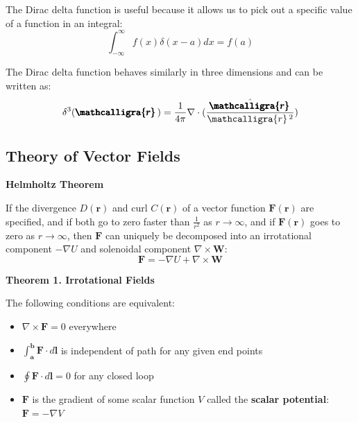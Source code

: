 \documentclass{article}
\newcommand{\scriptr}{\mathcalligra{r}\,}
\newcommand{\boldscriptr}{\pmb{\mathcalligra{r}}\,}
\begin{document}
The Dirac delta function is useful because it allows us to pick out a specific value of a function in an integral:
\[
    \int_{-\infty }^{\infty }f(x)\delta(x-a)dx=f(a)
\]

The Dirac delta function behaves similarly in three dimensions and can be written as:
\[
    \delta^3(\boldscriptr)=\frac{1}{4 \pi }\nabla \cdot (\frac{\hat{\boldscriptr}}{\scriptr^2})
\]

\subsection{Theory of Vector Fields}
\begin{theorem}{\textbf{Helmholtz Theorem}}
    $ $ \newline
    
    If the divergence \(D(\mathbf{r} )\) and curl \(C(\mathbf{r} )\) of a vector function \(\mathbf{F}(\mathbf{r})\) are 
    specified, and if both go to zero faster than \(\frac{1}{r^2}\) as \(r\rightarrow\infty \), and if \(\mathbf{F}(\mathbf{r} )\) goes to 
    zero as \(r \rightarrow \infty \), then \(\mathbf{F}\) can uniquely be decomposed into an irrotational component \(-\nabla U\) and solenoidal component 
    \(\nabla \times \mathbf{W} \):
    \[
        \mathbf{F}=-\nabla U+\nabla \times \mathbf{W} 
    \]         
\end{theorem}

\begin{theorem}{\textbf{Theorem 1. Irrotational Fields}}
    $ $ \newline
    
    The following conditions are equivalent:
    \begin{itemize}
        \item \(\nabla \times \mathbf{F} =0\) everywhere
        \item \(\int_{\mathbf{a} }^{\mathbf{b} }\mathbf{F} \cdot d \mathbf{l} \) is independent of path for any given end points
        \item \(\oint \mathbf{F} \cdot d \mathbf{l} =0\) for any closed loop
        \item \(\mathbf{F}\) is the gradient of some scalar function \(V\) called the \textbf{scalar potential}: \(\mathbf{F}=-\nabla V\) 
    \end{itemize}
\end{theorem}
\end{document}
